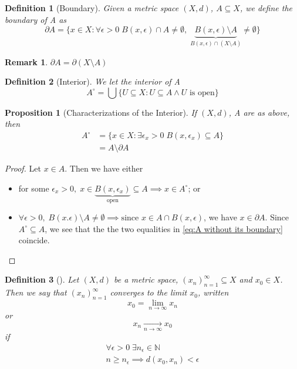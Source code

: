 \documentclass[11pt, oneside]{book}
\theoremstyle{break}
\newtheorem*{proof}{Proof}
\newtheorem{propo}{Proposition}[section]
\newtheorem*{remark}{Remark}
\newtheorem{defn}{Definition}[section]
\newcommand{\bb}[1]{\mathbb{#1}}			%
\begin{document}
\begin{defn}[Boundary]
	Given a metric space $(X, d)$, $A \subseteq X$, we define the boundary of A as
	\begin{equation}
		\partial A = \{x \in X : \forall \epsilon > 0 \; B(x, \epsilon) \cap A \neq \emptyset, \; \underbrace{B(x, \epsilon) \setminus A}_{B(x, \epsilon) \cap (X \setminus A)} \neq \emptyset \}
	\end{equation}
\end{defn}

\begin{remark}
	$\partial A = \partial(X \setminus A)$
\end{remark}

\begin{defn}[Interior]
	We let the interior of A
	\begin{equation}
		A^{\circ} = \bigcup \{U \subseteq X : U \subseteq A \land U \text{ is open} \}
	\end{equation}
\end{defn}

\begin{propo}[Characterizations of the Interior]
	If $(X, d)$, A are as above, then
	\begin{align}
		A^{\circ} &= \{x \in X : \exists \epsilon_x > 0 \; B(x, \epsilon_x) \subseteq A \} \\
			&= A \setminus \partial A \label{eq:A without its boundary}
	\end{align}
\end{propo}

\begin{proof}
	Let $x \in A$. Then we have either
	\begin{itemize}
		\item for some $\epsilon_x > 0, \; x \in \underbrace{B(x, \epsilon_x)}_{\text{open}} \subseteq A \implies x \in A^{\circ}$; or

		\item $\forall \epsilon > 0, \; B(x. \epsilon) \setminus A \neq \emptyset \implies \text{since } x \in A \cap B(x, \epsilon)$, we have $x \in \partial A$. Since $A^{\circ} \subseteq A$, we see that the the two equalities in \autoref{eq:A without its boundary} coincide.
	\end{itemize}
\end{proof}

\begin{defn}[]
	Let $(X, d)$ be a metric space, $(x_n)_{n = 1}^\infty \subseteq X$ and $x_0 \in X$. Then we say that $(x_n)_{n = 1}^\infty$ converges to the limit $x_0$, written
	\begin{equation}
		x_0 = \lim_{n \to \infty} x_n
	\end{equation}
	or
	\begin{equation}
		x_n \underset{n \to \infty}{\to} x_0
	\end{equation}
	if
	\begin{gather*}
		\forall \epsilon > 0 \; \exists n_\epsilon \in \bb{N} \\
		n \geq n_\epsilon \implies d(x_0, x_n) < \epsilon
	\end{gather*}
\end{defn}
\end{document}
